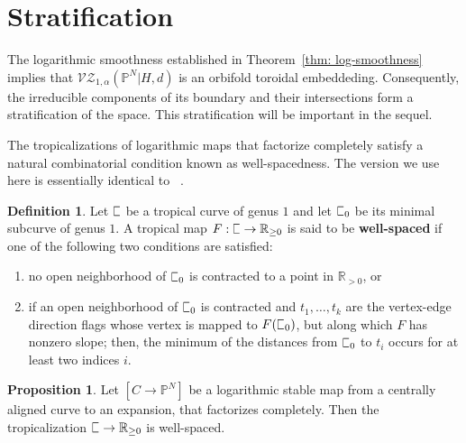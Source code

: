 \documentclass[11pt]{amsart}
\newcommand{\plC}{\scalebox{0.8}[1.3]{$\sqsubset$}}
\renewcommand{\to}{\rightarrow}
\theoremstyle{definition}
\newtheorem{prop}[thm]{Proposition}
\theoremstyle{definition}
\newtheorem{definition}[thm]{Definition}
\begin{document}
\section{Stratification} The logarithmic smoothness established in Theorem~\ref{thm: log-smoothness} implies that $\mathcal{VZ}_{1,\alpha}(\mathbb P^N|H,d)$ is an orbifold toroidal embeddeding. Consequently, the irreducible components of its boundary and their intersections form a stratification of the space. This stratification will be important in the sequel. 

The tropicalizations of logarithmic maps that factorize completely satisfy a natural combinatorial condition known as well-spacedness. The version we use here is essentially identical to~
\cite{RSPW2}. 

\begin{definition}
Let $\plC$ be a tropical curve of genus $1$ and let $\plC_0$ be its minimal subcurve of genus $1$. A tropical map $F: \plC\to \mathbb R_{\geq 0}$ is said to be \textbf{well-spaced} if one of the following two conditions are satisfied:
\begin{enumerate}
    \item no open neighborhood of $\plC_0$ is contracted to a point in $\mathbb R_{>0}$, or
    \item if an open neighborhood of $\plC_0$ is contracted and $t_1,\ldots,t_k$ are the vertex-edge direction flags whose vertex is mapped to $F(\plC_0)$, but along which $F$ has nonzero slope; then, the minimum of the distances from $\plC_0$ to $t_i$ occurs for at least two indices $i$.
\end{enumerate}
\end{definition}

\begin{prop}\label{prop: well-spaced}
Let $[C\to \mathbb P^N]$ be a logarithmic stable map from a centrally aligned curve to an expansion, that factorizes completely. Then the tropicalization $\plC\to \mathbb R_{\geq 0}$ is well-spaced.
\end{prop}
\end{document}
